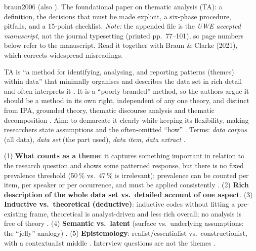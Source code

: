 \begin{papercard}{braun2006}
  (also  ). The foundational paper on thematic analysis (TA): a definition, the decisions that must be made explicit, a six-phase procedure, pitfalls, and a 15-point checklist. \emph{Note:} the appended file is the \emph{UWE accepted manuscript}, not the journal typesetting (printed pp.\ 77--101), so page numbers below refer to the manuscript. Read it together with Braun \& Clarke (2021), which corrects widespread misreadings.

 TA is ``a method for identifying, analysing, and reporting patterns (themes) within data'' that minimally organises and describes the data set in rich detail and often interprets it . It is a ``poorly branded'' method, so the authors argue it should be a method in its own right, independent of any one theory, and distinct from IPA, grounded theory, thematic discourse analysis and thematic decomposition . Aim: to demarcate it clearly while keeping its flexibility, making researchers state assumptions and the often-omitted ``how'' . Terms: \emph{data corpus} (all data), \emph{data set} (the part used), \emph{data item}, \emph{data extract} .

 (1) \textbf{What counts as a theme}: it captures something important in relation to the research question and shows some patterned response, but there is no fixed prevalence threshold (50\,\% vs.\ 47\,\% is irrelevant); prevalence can be counted per item, per speaker or per occurrence, and must be applied consistently . (2) \textbf{Rich description of the whole data set vs.\ detailed account of one aspect}. (3) \textbf{Inductive vs.\ theoretical (deductive)}: inductive codes without fitting a pre-existing frame, theoretical is analyst-driven and less rich overall; no analysis is free of theory . (4) \textbf{Semantic vs.\ latent} (surface vs.\ underlying assumptions; the ``jelly'' analogy) . (5) \textbf{Epistemology}: realist/essentialist vs.\ constructionist, with a contextualist middle . Interview questions are not the themes .


\end{papercard}
